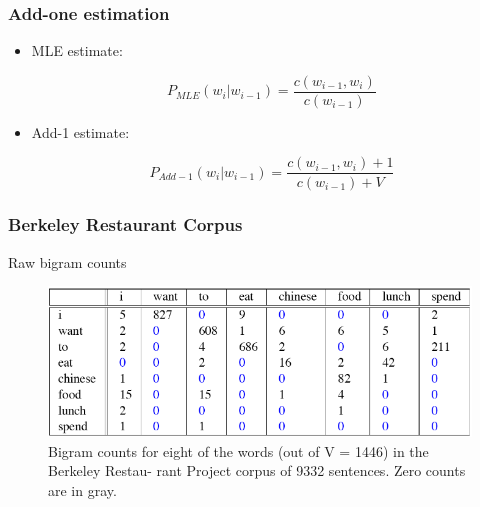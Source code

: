 \documentclass[13.5pt,aspecratio=169]{beamer}
\begin{document}
\begin{frame}
\onehalfspacing
	\frametitle{Add-one estimation}
	
    \begin{itemize}
        \item MLE estimate:  
        \vspace{-2em}
        \begin{center} 
            \[ P_{MLE}(w_i | w_{i-1}) = \frac{c(w_{i-1}, w_i)}{c(w_{i-1})} \]
          \end{center}
        \item Add-1 estimate:
        \vspace{-2em}
        \begin{center} 
            \[ P_{Add-1}(w_i | w_{i-1}) = \frac{c(w_{i-1}, w_i) + 1}{c(w_{i-1}) + V} \]
          \end{center}
    \end{itemize}
\end{frame}

\begin{frame}
    \onehalfspacing
        \frametitle{Berkeley Restaurant Corpus}
        \begin{minipage}{0.3\textwidth}
            \begin{block}{}
                Raw bigram counts
            \end{block}
        \end{minipage}
        
        \bigskip
            \begin{figure}
                \centering
                \includegraphics [scale=0.6] {raw_bigram_counts.png}
                \caption{Bigram counts for eight of the words (out of V = 1446) in the Berkeley Restau-
                rant Project corpus of 9332 sentences. Zero counts are in gray.}
            \end{figure}
        
\end{frame}
\end{document}
